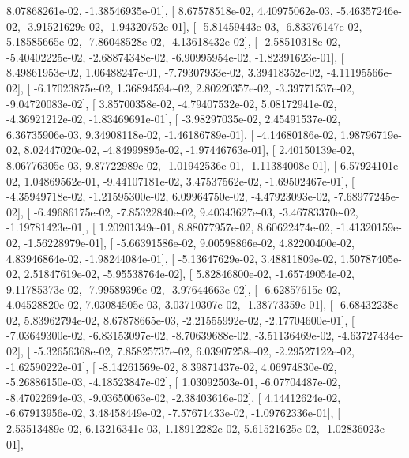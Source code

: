 \documentclass{article}
\begin{document}
          8.07868261e-02,  -1.38546935e-01],
       [  8.67578518e-02,   4.40975062e-03,  -5.46357246e-02,
         -3.91521629e-02,  -1.94320752e-01],
       [ -5.81459443e-03,  -6.83376147e-02,   5.18585665e-02,
         -7.86048528e-02,  -4.13618432e-02],
       [ -2.58510318e-02,  -5.40402225e-02,  -2.68874348e-02,
         -6.90995954e-02,  -1.82391623e-01],
       [  8.49861953e-02,   1.06488247e-01,  -7.79307933e-02,
          3.39418352e-02,  -4.11195566e-02],
       [ -6.17023875e-02,   1.36894594e-02,   2.80220357e-02,
         -3.39771537e-02,  -9.04720083e-02],
       [  3.85700358e-02,  -4.79407532e-02,   5.08172941e-02,
         -4.36921212e-02,  -1.83469691e-01],
       [ -3.98297035e-02,   2.45491537e-02,   6.36735906e-03,
          9.34908118e-02,  -1.46186789e-01],
       [ -4.14680186e-02,   1.98796719e-02,   8.02447020e-02,
         -4.84999895e-02,  -1.97446763e-01],
       [  2.40150139e-02,   8.06776305e-03,   9.87722989e-02,
         -1.01942536e-01,  -1.11384008e-01],
       [  6.57924101e-02,   1.04869562e-01,  -9.44107181e-02,
          3.47537562e-02,  -1.69502467e-01],
       [ -4.35949718e-02,  -1.21595300e-02,   6.09964750e-02,
         -4.47923093e-02,  -7.68977245e-02],
       [ -6.49686175e-02,  -7.85322840e-02,   9.40343627e-03,
         -3.46783370e-02,  -1.19781423e-01],
       [  1.20201349e-01,   8.88077957e-02,   8.60622474e-02,
         -1.41320159e-02,  -1.56228979e-01],
       [ -5.66391586e-02,   9.00598866e-02,   4.82200400e-02,
          4.83946864e-02,  -1.98244084e-01],
       [ -5.13647629e-02,   3.48811809e-02,   1.50787405e-02,
          2.51847619e-02,  -5.95538764e-02],
       [  5.82846800e-02,  -1.65749054e-02,   9.11785373e-02,
         -7.99589396e-02,  -3.97644663e-02],
       [ -6.62857615e-02,   4.04528820e-02,   7.03084505e-03,
          3.03710307e-02,  -1.38773359e-01],
       [ -6.68432238e-02,   5.83962794e-02,   8.67878665e-03,
         -2.21555992e-02,  -2.17704600e-01],
       [ -7.03649300e-02,  -6.83153097e-02,  -8.70639688e-02,
         -3.51136469e-02,  -4.63727434e-02],
       [ -5.32656368e-02,   7.85825737e-02,   6.03907258e-02,
         -2.29527122e-02,  -1.62590222e-01],
       [ -8.14261569e-02,   8.39871437e-02,   4.06974830e-02,
         -5.26886150e-03,  -4.18523847e-02],
       [  1.03092503e-01,  -6.07704487e-02,  -8.47022694e-03,
         -9.03650063e-02,  -2.38403616e-02],
       [  4.14412624e-02,  -6.67913956e-02,   3.48458449e-02,
         -7.57671433e-02,  -1.09762336e-01],
       [  2.53513489e-02,   6.13216341e-03,   1.18912282e-02,
          5.61521625e-02,  -1.02836023e-01],
\end{document}
